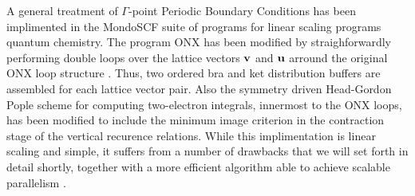\documentclass[prb,aps,nobibnotes,twocolumn,doublespace,twocolumngrid,superbib]{revtex4}
\begin{document}
A general treatment of $\Gamma$-point Periodic Boundary Conditions has been implimented in the MondoSCF
suite of programs for linear scaling programs quantum chemistry.  The program {\sc ONX} \cite{} has been 
modified by straighforwardly performing double loops over the lattice vectors $\bf v$ and $\bf u$
arround the original ONX loop structure \cite{}.  Thus, two ordered bra and ket distribution buffers are 
assembled for each lattice vector pair.   Also the symmetry driven Head-Gordon Pople scheme for 
computing two-electron integrals, innermost to the ONX loops, has been modified to include the 
minimum image criterion in the contraction stage of the vertical recurence relations.  While this 
implimentation is linear scaling and simple, it suffers from a number of drawbacks that we will set 
forth in detail shortly, together with a more efficient algorithm able to achieve scalable parallelism \cite{}.

\pagebreak
\end{document}
